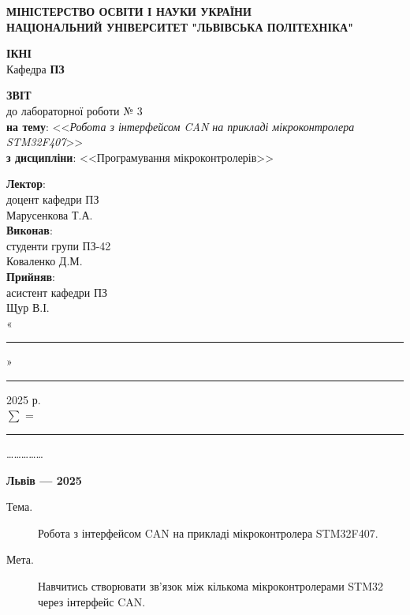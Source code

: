 \documentclass[oneside,14pt]{extarticle}
\newcommand\subject{Програмування мікроконтролерів}
\newcommand\lecturer{доцент кафедри ПЗ\\Марусенкова Т.А.}
\newcommand\teacher{асистент кафедри ПЗ\\Щур В.І.}
\newcommand\mygroup{ПЗ-42}
\newcommand\lab{3}
\newcommand\theme{Робота з інтерфейсом CAN на прикладі мікроконтролера STM32F407}
\newcommand\purpose{Навчитись створювати зв'язок між кількома мікроконтролерами STM32
через інтерфейс CAN}
\begin{document}
\begin{normalsize}
	\begin{titlepage}
		\thispagestyle{empty}
		\begin{center}
			\textbf{МІНІСТЕРСТВО ОСВІТИ І НАУКИ УКРАЇНИ\\
				НАЦІОНАЛЬНИЙ УНІВЕРСИТЕТ "ЛЬВІВСЬКА ПОЛІТЕХНІКА"}
		\end{center}
		\begin{flushright}
			\textbf{ІКНІ}\\
			Кафедра \textbf{ПЗ}
		\end{flushright}
		\vspace{80pt}
		\begin{center}
			\textbf{ЗВІТ}\\
			\vspace{10pt}
			до лабораторної роботи № \lab\\
			\textbf{на тему}: <<\textit{\theme}>>\\
			\textbf{з дисципліни}: <<\subject>>
		\end{center}
		\vspace{80pt}
		\begin{flushright}
			
			\textbf{Лектор}:\\
			\lecturer\\
			\vspace{28pt}
			\textbf{Виконав}:\\
			
			студенти групи \mygroup\\
			Коваленко Д.М.\\
			\vspace{28pt}
			\textbf{Прийняв}:\\
			
			\teacher\\
			
			\vspace{28pt}
			«\rule{1cm}{0.15mm}» \rule{1.5cm}{0.15mm} 2025 р.\\
			$\sum$ = \rule{1cm}{0.15mm}……………\\
			
		\end{flushright}
		\vspace{\fill}
		\begin{center}
			\textbf{Львів — 2025}
		\end{center}
	\end{titlepage}
		
	\begin{description}
		\item[Тема.] \theme.
		\item[Мета.] \purpose.
	\end{description}


\end{normalsize}
\end{document}
